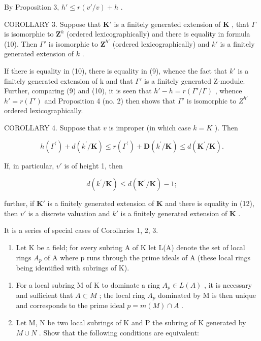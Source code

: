By Proposition 3, \(h' \leqslant r(v'/v) + h\) .

COROLLARY 3. Suppose that \(\mathbf{K}'\) is a finitely generated extension of \(\mathbf{K}\) , that \(\Gamma\) is isomorphic to \(\mathbf{Z}^h\) (ordered lexicographically) and there is equality in formula (10). Then \(\Gamma'\) is isomorphic to \(\mathbf{Z}^{h'}\) (ordered lexicographically) and \(k'\) is a finitely generated extension of \(k\) .

If there is equality in (10), there is equality in (9), whence the fact that \(k'\) is a finitely generated extension of k and that \(\Gamma'\) is a finitely generated Z-module. Further, comparing (9) and (10), it is seen that \(h' - h = r(\Gamma'/\Gamma)\) , whence \(h' = r(\Gamma')\) and Proposition 4 (no. 2) then shows that \(\Gamma'\) is isomorphic to \(Z^{h'}\) ordered lexicographically.

COROLLARY 4. Suppose that \(v\) is improper (in which case \(k = K\) ). Then

\[
h (\Gamma^ {\prime}) + d (k ^ {\prime} / \mathbf {K}) \leqslant r (\Gamma^ {\prime}) + \mathbf {D} (k ^ {\prime} / \mathbf {K}) \leqslant d (\mathbf {K} ^ {\prime} / \mathbf {K}).\tag{11}
\]

If, in particular, \(v'\) is of height 1, then

\[
d (k ^ {\prime} / \mathbf {K}) \leqslant d (\mathbf {K} ^ {\prime} / \mathbf {K}) - 1;\tag{12}
\]

further, if \(\mathbf{K}'\) is a finitely generated extension of \(\mathbf{K}\) and there is equality in (12), then \(v'\) is a discrete valuation and \(k'\) is a finitely generated extension of \(\mathbf{K}\) .

It is a series of special cases of Corollaries 1, 2, 3.



\begin{enumerate}
\def\labelenumi{\arabic{enumi}.}
\tightlist
\item
  Let K be a field; for every subring A of K let L(A) denote the set of local rings \(A_{p}\) of A where p runs through the prime ideals of A (these local rings being identified with subrings of K).
\end{enumerate}

\begin{enumerate}
\def\labelenumi{(\alph{enumi})}
\item
  For a local subring M of K to dominate a ring \(A_{p} \in L(A)\) , it is necessary and sufficient that \(A \subset M\) ; the local ring \(A_{p}\) dominated by M is then unique and corresponds to the prime ideal \(p = m(M) \cap A\) .
\item
  Let M, N be two local subrings of K and P the subring of K generated by \(M \cup N\) . Show that the following conditions are equivalent:
\end{enumerate}

